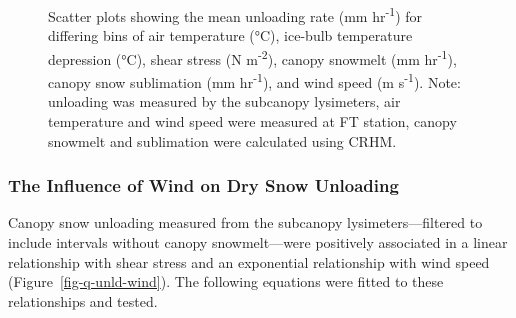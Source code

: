 \documentclass[
  letterpaper,
]{tex/uofsthesis-cs}
\begin{document}
\begin{figure}


\caption{\label{fig-q-unld-all-bins}Scatter plots showing the mean
unloading rate (mm hr\textsuperscript{-1}) for differing bins of air
temperature (°C), ice-bulb temperature depression (°C), shear stress (N
m\textsuperscript{-2}), canopy snowmelt (mm hr\textsuperscript{-1}),
canopy snow sublimation (mm hr\textsuperscript{-1}), and wind speed (m
s\textsuperscript{-1}). Note: unloading was measured by the subcanopy
lysimeters, air temperature and wind speed were measured at FT station,
canopy snowmelt and sublimation were calculated using CRHM.}

\end{figure}%

\subsubsection{The Influence of Wind on Dry Snow
Unloading}\label{sec-dry-unld}

Canopy snow unloading measured from the subcanopy lysimeters---filtered
to include intervals without canopy snowmelt---were positively
associated in a linear relationship with shear stress and an exponential
relationship with wind speed (Figure~\ref{fig-q-unld-wind}). The
following equations were fitted to these relationships and tested.
\end{document}
